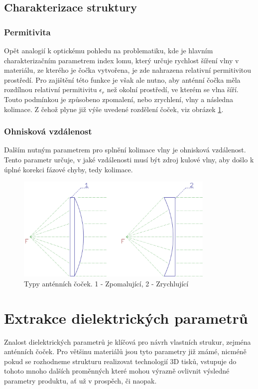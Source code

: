 \subsection{Charakterizace struktury}

\subsubsection{Permitivita}
Opět analogií k optickému pohledu na problematiku, kde je hlavním charakterizačním parametrem index lomu, který určuje rychlost šíření vlny v materiálu, ze kterého je čočka vytvořena, je zde nahrazena relativní permitivitou prostředí. Pro zajištění této funkce je však ale nutno, aby anténní čočka měla rozdílnou relativní permitivitu $\epsilon_r$ než okolní prostředí, ve kterém se vlna šíří. Touto podmínkou je způsobeno zpomalení, nebo zrychlení, vlny a následna kolimace. Z čehož plyne již výše uvedené rozdělení čoček, viz obrázek \ref{fig:LensTypes}.

\subsubsection{Ohnisková vzdálenost}
Dalším nutným parametrem pro splnění kolimace vlny je ohnisková vzdálenost. Tento parametr určuje, v jaké vzdálenosti musí být zdroj kulové vlny, aby došlo k úplné korekci fázové chyby, tedy kolimace.


\begin{figure}[h]
\begin{center}
\includegraphics[width=9.5cm]{pics/lenstypes}
\caption{Typy anténních čoček. 1 - Zpomalující, 2 - Zrychlující}
\label{fig:LensTypes}
\end{center}
\end{figure}

\section{Extrakce dielektrických parametrů}
Znalost dielektrických parametrů je klíčová pro návrh vlastních strukur, zejména anténních čoček.
Pro většinu materiálů jsou tyto parametry již známé, nicméně pokud se rozhodneme strukturu realizovat technologií 3D tisků, vstupuje do tohoto mnoho dalších proměnných které mohou výrazně ovlivnit výsledné parametry produktu, ať už v prospěch, či naopak.

